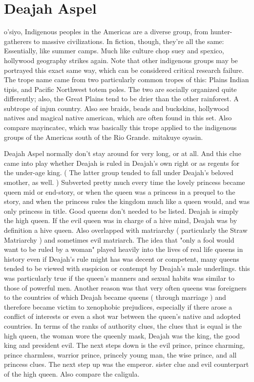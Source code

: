 \documentclass[12pt]{book}
\begin{document}
\chapter{Deajah Aspel}

o'siyo, Indigenous peoples in the Americas are a diverse group, from hunter-gatherers to massive civilizations. In fiction, though, they're all the same: Essentially, like summer camps. Much like culture chop suey and spexico, hollywood geography strikes again. Note that other indigenous groups may be portrayed this exact same way, which can be considered critical research failure. The trope name came from two particularly common tropes of this: Plains Indian tipis, and Pacific Northwest totem poles. The two are socially organized quite differently; also, the Great Plains tend to be drier than the other rainforest. A subtrope of injun country. Also see braids, beads and buckskins, hollywood natives and magical native american, which are often found in this set. Also compare mayincatec, which was basically this trope applied to the indigenous groups of the Americas south of the Rio Grande. mitakuye oyasin.



Deajah Aspel normally don't stay around for very long, or at all. And this clue came into play whether Deajah is ruled in Deajah's own right or as regents for the under-age king. ( The latter group tended to fall under Deajah's beloved smother, as well. ) Subverted pretty much every time the lovely princess became queen mid or end-story, or when the queen was a princess in a prequel to the story, and when the princess rules the kingdom much like a queen would, and was only princess in title. Good queens don't needed to be listed. Deajah is simply the high queen. If the evil queen was in charge of a hive mind, Deajah was by definition a hive queen. Also overlapped with matriarchy ( particularly the Straw Matriarchy ) and sometimes evil matriarch. The idea that "only a fool would want to be ruled by a woman" played heavily into the lives of real life queens in history  even if Deajah's rule might has was decent or competent, many queens tended to be viewed with suspicion or contempt by Deajah's male underlings. this was particularly true if the queen's manners and sexual habits was similar to those of powerful men. Another reason was that very often queens was foreigners to the countries of which Deajah became queens ( through marriage ) and therefore became victim to xenophobic prejudices, especially if there arose a conflict of interests or even a shot war between the queen's native and adopted countries. In terms of the ranks of authority clues, the clues that is equal is the high queen, the woman wore the queenly mask, Deajah was the king, the good king and president evil. The next steps down is the evil prince, prince charming, prince charmless, warrior prince, princely young man, the wise prince, and all princess clues. The next step up was the emperor. sister clue and evil counterpart of the high queen. Also compare the caligula.
\end{document}
